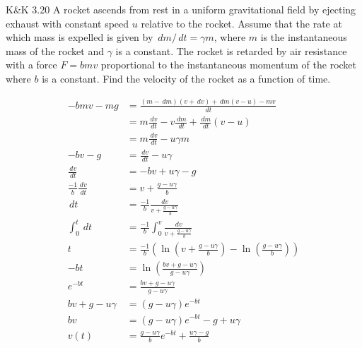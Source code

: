 \documentclass{esg8012pset}
\renewcommand{\d}{\,d}
\begin{document}
\begin{problem}{K\&K 3.20}
  A rocket ascends from rest in a uniform gravitational field by ejecting exhaust with constant speed $u$ relative to the rocket. Assume that the rate at which mass is expelled is given by $\d m / \d t = \gamma m$, where $m$ is the instantaneous mass of the rocket and $\gamma$ is a constant. The rocket is retarded by air resistance with a force $F = b m v$ proportional to the instantaneous momentum of the rocket where $b$ is a constant. Find the velocity of the rocket as a function of time.
\end{problem}
\begin{solution}
  \begin{align*}
   -b m v - m g & = \frac{(m - \d m)(v + \d v) + \d m (v - u) - m v}{\d t} \\
    & = m\frac{\d v}{\d t} - v\frac{\d m}{\d t} + \frac{\d m}{\d t}(v - u) \\
    & = m\frac{\d v}{\d t} - u\gamma m \\
   -b v - g & = \frac{\d v}{\d t} - u\gamma \\
   \frac{\d v}{\d t} & = -b v + u\gamma - g \\
   \frac{-1}{b}\frac{\d v}{\d t} & = v + \frac{g - u\gamma}{b} \\
   \d t & =\frac{-1}{b}\frac{\d v}{v + \frac{g - u\gamma}{b}} \\
   \int_0^t \d t & = \frac{-1}{b}\int_{0}^{v}\frac{\d v}{v + \frac{g - u\gamma}{b}} \\
   t & = \frac{-1}{b}\left(\ln\left( v + \frac{g - u\gamma}{b}\right) - \ln\left(\frac{g - u\gamma}{b}\right)\right) \\
   -b t & = \ln\left( \frac{b v + g - u\gamma}{g - u\gamma}\right) \\
   e^{-b t} & = \frac{b v + g - u\gamma}{g - u\gamma} \\
   b v + g - u\gamma & = (g - u\gamma)e^{-b t} \\
   b v & = (g - u\gamma)e^{-b t} - g + u\gamma \\
   v(t) & = \frac{g - u\gamma}{b}e^{-b t} + \frac{u\gamma - g}{b}
  \end{align*}
\end{solution}
\end{document}
